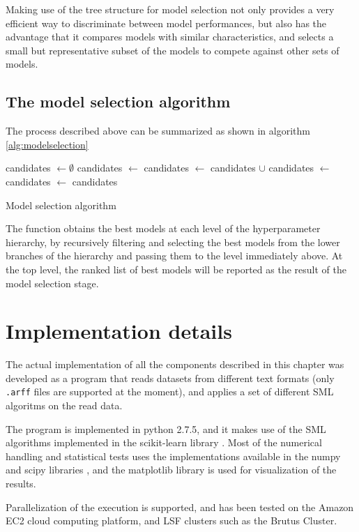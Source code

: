 Making use of the tree structure for model selection not only provides a very efficient way to
discriminate between model performances, but also has the advantage that it compares models with
similar characteristics, and selects a small but representative subset of the models to compete
against other sets of models.

\subsection{The model selection algorithm}
The process described above can be summarized as shown in algorithm \ref{alg:modelselection}

\begin{algorithm}[here]
	\begin{algorithmic}
			\State candidates $\gets \emptyset$
				\State candidates $\gets$ 
			\Else
					\State candidates $\gets$ candidates $\cup$ 
				\EndFor
			\EndIf
			\State candidates $\gets$ 
			\State candidates $\gets$ 
			\State\Return candidates
		\EndFunction
	\end{algorithmic}
	\caption{Model selection algorithm}
	\label{alg:modelselection}
\end{algorithm}

The function obtains the best models at each level of the hyperparameter hierarchy, by recursively
filtering and selecting the best models from the lower branches of the hierarchy and passing them to
the level immediately above. At the top level, the ranked list of best models will be reported as
the result of the model selection stage.

\section{Implementation details}

The actual implementation of all the components described in this chapter was developed as a program
that reads datasets from different text formats (only \texttt{.arff} files are supported at the
moment), and applies a set of different SML algoritms on the read data.

The program is implemented in python 2.7.5, and it makes use of the SML algorithms implemented in
the scikit-learn library \cite{scikit-learn}. Most of the numerical handling and statistical tests
uses the implementations available in the numpy and scipy libraries \cite{scipy}, and the matplotlib
library \cite{matplotlib} is used for visualization of the results.


Parallelization of the execution is supported, and has been tested on the Amazon EC2 cloud computing
platform, and LSF clusters such as the Brutus Cluster.
